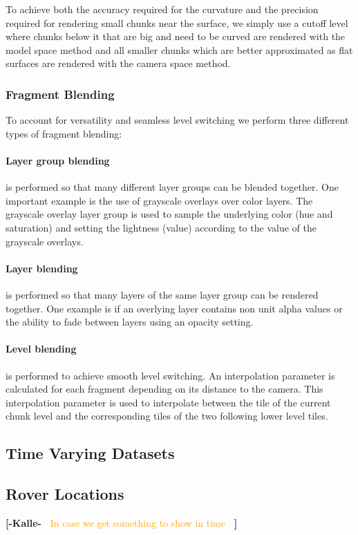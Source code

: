 \documentclass[journal]{vgtc}                %
\newcommand{\kallecomment}[1]{\textbf{[-Kalle-~}
    \textcolor{orange}{#1}
    \textbf{~]}}
\begin{document}
To achieve both the accuracy required for the curvature and the precision required for rendering small chunks near the surface, we simply use a cutoff level where chunks below it that are big and need to be curved are rendered with the model space method and all smaller chunks which are better approximated as flat surfaces are rendered with the camera space method.

\subsubsection{Fragment Blending}

To account for versatility and seamless level switching we perform three different types of fragment blending:

\paragraph{Layer group blending} is performed so that many different layer groups can be blended together.
One important example is the use of grayscale overlays over color layers.
The grayscale overlay layer group is used to sample the underlying color (hue and saturation) and setting the lightness (value) according to the value of the grayscale overlays.

\paragraph{Layer blending} is performed so that many layers of the same layer group can be rendered together.
One example is if an overlying layer contains non unit alpha values or the ability to fade between layers using an opacity setting.

\paragraph{Level blending} is performed to achieve smooth level switching.
An interpolation parameter is calculated for each fragment depending on its distance to the camera.
This interpolation parameter is used to interpolate between the tile of the current chunk level and the corresponding tiles of the two following lower level tiles.

\subsection{Time Varying Datasets}

\subsection{Rover Locations}
\kallecomment{In case we get something to show in time}
\end{document}
